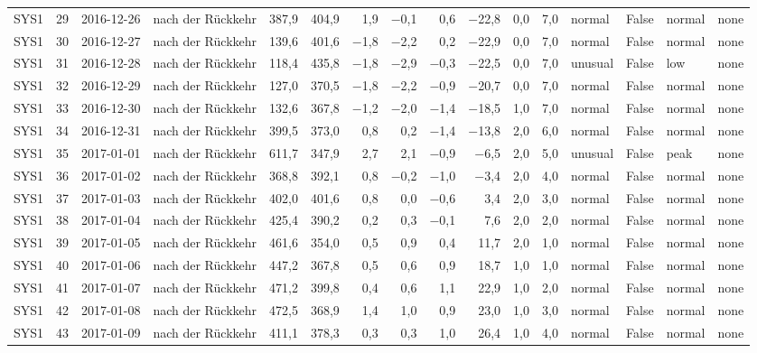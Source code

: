 \begin{tabular}{lrllrrrrrrrrlrll}
SYS1 & 29 & 2016-12-26 & nach der Rückkehr & 387,9 & 404,9 & 1,9 & $-$0,1 & 0,6 & $-$22,8 & 0,0 & 7,0 & normal & False & normal & none \\
SYS1 & 30 & 2016-12-27 & nach der Rückkehr & 139,6 & 401,6 & $-$1,8 & $-$2,2 & 0,2 & $-$22,9 & 0,0 & 7,0 & normal & False & normal & none \\
SYS1 & 31 & 2016-12-28 & nach der Rückkehr & 118,4 & 435,8 & $-$1,8 & $-$2,9 & $-$0,3 & $-$22,5 & 0,0 & 7,0 & unusual & False & low & none \\
SYS1 & 32 & 2016-12-29 & nach der Rückkehr & 127,0 & 370,5 & $-$1,8 & $-$2,2 & $-$0,9 & $-$20,7 & 0,0 & 7,0 & normal & False & normal & none \\
SYS1 & 33 & 2016-12-30 & nach der Rückkehr & 132,6 & 367,8 & $-$1,2 & $-$2,0 & $-$1,4 & $-$18,5 & 1,0 & 7,0 & normal & False & normal & none \\
SYS1 & 34 & 2016-12-31 & nach der Rückkehr & 399,5 & 373,0 & 0,8 & 0,2 & $-$1,4 & $-$13,8 & 2,0 & 6,0 & normal & False & normal & none \\
SYS1 & 35 & 2017-01-01 & nach der Rückkehr & 611,7 & 347,9 & 2,7 & 2,1 & $-$0,9 & $-$6,5 & 2,0 & 5,0 & unusual & False & peak & none \\
SYS1 & 36 & 2017-01-02 & nach der Rückkehr & 368,8 & 392,1 & 0,8 & $-$0,2 & $-$1,0 & $-$3,4 & 2,0 & 4,0 & normal & False & normal & none \\
SYS1 & 37 & 2017-01-03 & nach der Rückkehr & 402,0 & 401,6 & 0,8 & 0,0 & $-$0,6 & 3,4 & 2,0 & 3,0 & normal & False & normal & none \\
SYS1 & 38 & 2017-01-04 & nach der Rückkehr & 425,4 & 390,2 & 0,2 & 0,3 & $-$0,1 & 7,6 & 2,0 & 2,0 & normal & False & normal & none \\
SYS1 & 39 & 2017-01-05 & nach der Rückkehr & 461,6 & 354,0 & 0,5 & 0,9 & 0,4 & 11,7 & 2,0 & 1,0 & normal & False & normal & none \\
SYS1 & 40 & 2017-01-06 & nach der Rückkehr & 447,2 & 367,8 & 0,5 & 0,6 & 0,9 & 18,7 & 1,0 & 1,0 & normal & False & normal & none \\
SYS1 & 41 & 2017-01-07 & nach der Rückkehr & 471,2 & 399,8 & 0,4 & 0,6 & 1,1 & 22,9 & 1,0 & 2,0 & normal & False & normal & none \\
SYS1 & 42 & 2017-01-08 & nach der Rückkehr & 472,5 & 368,9 & 1,4 & 1,0 & 0,9 & 23,0 & 1,0 & 3,0 & normal & False & normal & none \\
SYS1 & 43 & 2017-01-09 & nach der Rückkehr & 411,1 & 378,3 & 0,3 & 0,3 & 1,0 & 26,4 & 1,0 & 4,0 & normal & False & normal & none \\

\end{tabular}
